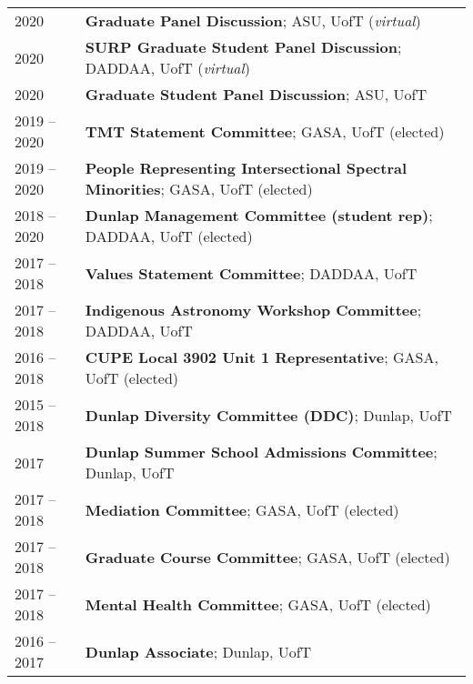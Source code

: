\documentclass[10pt]{res} %
\begin{document}
\begin{resume}
\begin{table}[h!]
\begin{tabularx}{\textwidth}{lX}
2020 & \textbf{Graduate Panel Discussion}; ASU, UofT (\textit{virtual}) \\
2020 & \textbf{SURP Graduate Student Panel Discussion}; DADDAA, UofT (\textit{virtual}) \\
2020 & \textbf{Graduate Student Panel Discussion}; ASU, UofT \\
2019 -- 2020 & \textbf{TMT Statement Committee}; GASA, UofT (elected) \\
2019 -- 2020 & \textbf{People Representing Intersectional Spectral Minorities}; GASA, UofT (elected) \\
2018 -- 2020 & \textbf{Dunlap Management Committee (student rep)}; DADDAA, UofT (elected) \\
2017 -- 2018 & \textbf{Values Statement Committee}; DADDAA, UofT \\
2017 -- 2018 & \textbf{Indigenous Astronomy  Workshop Committee}; DADDAA, UofT \\
2016 --  2018 & \textbf{CUPE Local 3902 Unit 1 Representative}; GASA, UofT (elected) \\
2015 --  2018 & \textbf{Dunlap Diversity Committee (DDC)}; Dunlap, UofT \\
2017 & \textbf{Dunlap Summer School Admissions Committee}; Dunlap, UofT \\
2017 -- 2018 & \textbf{Mediation Committee}; GASA, UofT (elected) \\
2017 -- 2018 & \textbf{Graduate Course Committee}; GASA, UofT (elected) \\
2017 -- 2018 & \textbf{Mental Health Committee}; GASA, UofT (elected) \\
2016 --  2017 & \textbf{Dunlap Associate}; Dunlap, UofT
\end{tabularx}
\end{table}



\end{resume}
\end{document}
